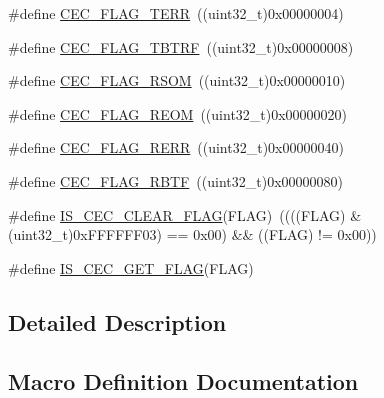 \begin{DoxyCompactItemize}
\#define \mbox{\hyperlink{group___c_e_c__flags__definition_ga7edc608ca7b4ea74dd4d795fa3214c11}{C\+E\+C\+\_\+\+F\+L\+A\+G\+\_\+\+T\+E\+RR}}~((uint32\+\_\+t)0x00000004)
\item 
\#define \mbox{\hyperlink{group___c_e_c__flags__definition_gaeb02634fdd06f4ea0990e2cf23cf200e}{C\+E\+C\+\_\+\+F\+L\+A\+G\+\_\+\+T\+B\+T\+RF}}~((uint32\+\_\+t)0x00000008)
\item 
\#define \mbox{\hyperlink{group___c_e_c__flags__definition_ga4e352d4f48e3b197edf150860703d2bf}{C\+E\+C\+\_\+\+F\+L\+A\+G\+\_\+\+R\+S\+OM}}~((uint32\+\_\+t)0x00000010)
\item 
\#define \mbox{\hyperlink{group___c_e_c__flags__definition_gaffeaec4eafbf1efbd88139b9bb0654a7}{C\+E\+C\+\_\+\+F\+L\+A\+G\+\_\+\+R\+E\+OM}}~((uint32\+\_\+t)0x00000020)
\item 
\#define \mbox{\hyperlink{group___c_e_c__flags__definition_gac2376c2b958536ab414574f60cb5d75a}{C\+E\+C\+\_\+\+F\+L\+A\+G\+\_\+\+R\+E\+RR}}~((uint32\+\_\+t)0x00000040)
\item 
\#define \mbox{\hyperlink{group___c_e_c__flags__definition_gae73c6ec73ab8ad57b18d3bd416baf2d3}{C\+E\+C\+\_\+\+F\+L\+A\+G\+\_\+\+R\+B\+TF}}~((uint32\+\_\+t)0x00000080)
\item 
\#define \mbox{\hyperlink{group___c_e_c__flags__definition_ga418911667f82a12dd097f7fac7ad4e89}{I\+S\+\_\+\+C\+E\+C\+\_\+\+C\+L\+E\+A\+R\+\_\+\+F\+L\+AG}}(F\+L\+AG)~((((F\+L\+AG) \& (uint32\+\_\+t)0x\+F\+F\+F\+F\+F\+F03) == 0x00) \&\& ((\+F\+L\+A\+G) != 0x00))
\item 
\#define \mbox{\hyperlink{group___c_e_c__flags__definition_ga929b30d90f6807e9f72976596b0b850b}{I\+S\+\_\+\+C\+E\+C\+\_\+\+G\+E\+T\+\_\+\+F\+L\+AG}}(F\+L\+AG)
\end{DoxyCompactItemize}


\subsection{Detailed Description}


\subsection{Macro Definition Documentation}
\mbox{\label{group___c_e_c__flags__definition_ga1583b7a221e54f2f19cb121bf310547c}} 
